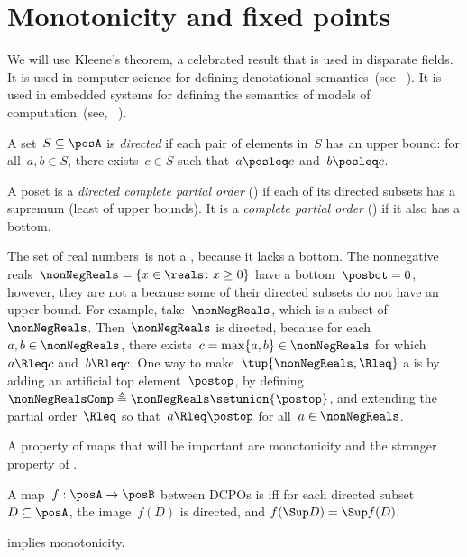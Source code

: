
\section{Monotonicity and fixed points}
\label{sec:Monotonicity-and-fixed}

We will use Kleene's theorem, a celebrated result that is used in disparate fields.
It is used in computer science for defining denotational semantics~(see \eg~\cite{manes86}).
It is used in embedded systems for defining the semantics of models of computation~(see, \eg~\cite{lee10}).

\begin{definition}
	\label{def:directed-set}
	A set~$S\subseteq\posA$ is \emph{directed} if each pair of elements in~$S$ has an upper bound: for all~$a,b\in S$, there exists~$c\in S$ such that~$a\posleq c$ and~$b\posleq c$.
\end{definition}

\begin{definition}[Completeness]
	\label{def:cpo}
	A poset is a \emph{directed complete partial order} (\DCPO) if each of its directed subsets has a supremum (least of upper bounds).
	It is a \emph{complete partial order} (\CPO) if it also has a bottom.
\end{definition}

\begin{example}
	\label{exa:Rcomp}
	The set of real numbers~\reals is not a \CPO, because it lacks a bottom.
	The nonnegative reals~$\nonNegReals=\{x\in\reals \colon x\geq0\}$ have a bottom~$\posbot=0$, however, they are not a \DCPO because some of their directed subsets do not have an upper bound.
	For example, take~$\nonNegReals$, which is a subset of~$\nonNegReals$.
	Then~$\nonNegReals$ is directed, because for each~$a,b\in\nonNegReals$, there exists~$c=\max\{a,b\}\in\nonNegReals$ for which~$a\Rleq c$ and~$b\Rleq c$.
	One way to make~$\tup{ \nonNegReals,\Rleq} $ a \CPO is by adding an artificial top element~$\postop$, by defining~$\nonNegRealsComp\triangleq\nonNegReals\setunion\{\postop\}$, and extending the partial order~$\Rleq$ so that~$a\Rleq\postop$ for all~$a\in\nonNegReals$.
\end{example}

A property of maps that will be important are monotonicity and the stronger property of \scottcontinuity.

\begin{definition}[\scottcontinuity]
	\label{def:scott}
	A map~$f:\posA\rightarrow\posB$ between DCPOs is \emph{\scottcontinuous{}} iff for each directed subset~$D\subseteq\posA$, the image~$f(D)$ is directed, and $f(\Sup D)=\Sup f(D).
	$
\end{definition}
\begin{remark}
	\scottcontinuity implies monotonicity.
\end{remark}

